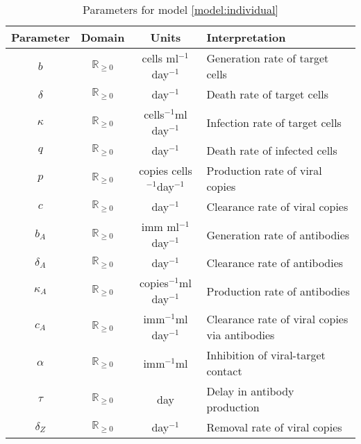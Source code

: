 \documentclass[11pt]{article}
\numberwithin{equation}{subsection}
\newcommand{\iv}{$^{-1}$}
\newcommand{\Rnn}{\mathbb{R}_{\geq 0}}
\begin{document}
    \begin{table}[h!]
        \centering
        \caption{Parameters for model \ref{model:individual}}
        \vspace{1em}
        \begin{tabular}{cccl} \hline\hline
            Parameter   & Domain    & Units     & Interpretation \\\hline\hline
            $b$         & $\Rnn$    & cells ml\iv day\iv
                                                & Generation rate of target cells \\
            $\delta$    & $\Rnn$    & day\iv
                                                & Death rate of target cells \\
            $\kappa$    & $\Rnn$    & cells\iv ml day\iv
                                                & Infection rate of target cells \\
            $q$         & $\Rnn$    & day\iv
                                                & Death rate of infected cells \\
            $p$         & $\Rnn$    & copies cells\iv day\iv
                                                & Production rate of viral copies \\
            $c$         & $\Rnn$    & day\iv
                                                & Clearance rate of viral copies \\
            $b_A$       & $\Rnn$    & imm ml\iv day\iv
                                                & Generation rate of antibodies \\
            $\delta_A$  & $\Rnn$    & day\iv
                                                & Clearance rate of antibodies \\
            $\kappa_A$  & $\Rnn$    & copies\iv ml day\iv
                                                & Production rate of antibodies \\
            $c_A$       & $\Rnn$    & imm\iv ml day\iv
                                                & Clearance rate of viral copies via antibodies \\
            $\alpha$    & $\Rnn$    & imm\iv ml
                                                & Inhibition of viral-target contact \\
            $\tau$      & $\Rnn$    & day
                                                & Delay in antibody production \\
            $\delta_Z$  & $\Rnn$    & day\iv
                                                & Removal rate of viral copies \\

\end{tabular}
\end{table}
\end{document}
